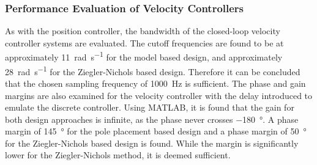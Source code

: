\documentclass[../../main.tex]{subfiles}
\begin{document}
\subsubsection*{Performance Evaluation of Velocity Controllers}

As with the position controller, the bandwidth of the closed-loop velocity controller systems are evaluated. The cutoff frequencies are found to be at approximately \SI{11}{\radian \per \second} for the model based design, and approximately \SI{28}{\radian \per \second} for the Ziegler-Nichols based design. Therefore it can be concluded that the chosen sampling frequency of \SI{1000}{\hertz} is sufficient. 
The phase and gain margins are also examined for the velocity controller with the delay introduced to emulate the discrete controller. Using MATLAB, it is found that the gain for both design approaches is infinite, as the phase never crosses \SI{-180}{\degree}. A phase margin of \SI{145}{\degree} for the pole placement based design and a phase margin of \SI{50}{\degree} for the Ziegler-Nichols based design is found. While the margin is significantly lower for the Ziegler-Nichols method, it is deemed sufficient.


\end{document}
